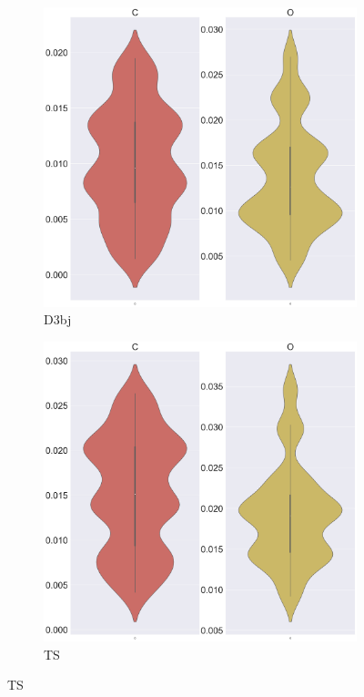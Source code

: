 \begin{figure}
\begin{subfigure}{0.45\textwidth}
\centering
\includegraphics[width=\textwidth]{Figures/Analysis/IVDW/D3BJ_AtomicShift_2.png}
\caption{D3\acrshort{bj}}
\label{fig:StructAnal2_D3BJ}
\end{subfigure}
\begin{subfigure}{0.45\textwidth}
\centering
\includegraphics[width=\textwidth]{Figures/Analysis/IVDW/TS_AtomicShift_2.png}
\caption{TS}
\label{fig:StructAnal2_TS}
\end{subfigure}


\end{figure}
